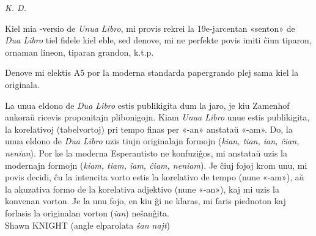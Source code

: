 \documentclass[ngerman,12pt,twoside]{book}
\begin{document}
\begin{flushright}
\it K. D. 
\end{flushright}

\begin{center}
\end{center}
\titlespacing*{\chapter}{0pt}{0pt}{0pt}

%
%
\cleardoublepage


%
%
\kolofono

\small Kiel mia \XeLaTeX{}-versio de \emph{Unua Libro}, mi provis rekrei la 19e-jarcentan «senton» de \emph{Dua Libro} tiel fidele kiel eble, sed denove, mi ne perfekte povis imiti ĉiun tiparon, ornaman lineon, tiparan grandon, k.t.p.

Denove mi elektis A5 por la moderna standarda papergrando plej sama kiel la originala.

La unua eldono de \emph{Dua Libro} estis publikigita dum la jaro, je kiu Zamenhof ankoraŭ ricevis proponitajn plibonigojn.  Kiam \emph{Unua Libro} unue estis publikigita, la korelativoj (tabelvortoj) pri tempo finas per «-an» anstataŭ «-am».  Do, la unua eldono de \emph{Dua Libro} uzis tiujn originalajn formojn (\emph{kian, tian, ian, ĉian, nenian}).  Por ke la moderna Esperantisto ne konfuziĝos, mi anstataŭ uzis la modernajn formojn (\emph{kiam, tiam, iam, ĉiam, neniam}).  Je ĉiuj fojoj krom unu, mi povis decidi, ĉu la intencita vorto estis la korelativo de tempo (nune «-am»), aŭ la akuzativa formo de la korelativa adjektivo (nune «-an»), kaj mi uzis la konvenan vorton.  Je la unu fojo, en kiu ĝi ne klaras, mi faris piednoton kaj forlasis la originalan vorton (\emph{ian}) neŝanĝita.\\[1ex] 

{\setlength{\parindent}{0em}
Shawn KNIGHT (angle elparolata \emph{ŝan najt})\\
\hodiau}


\end{document}
